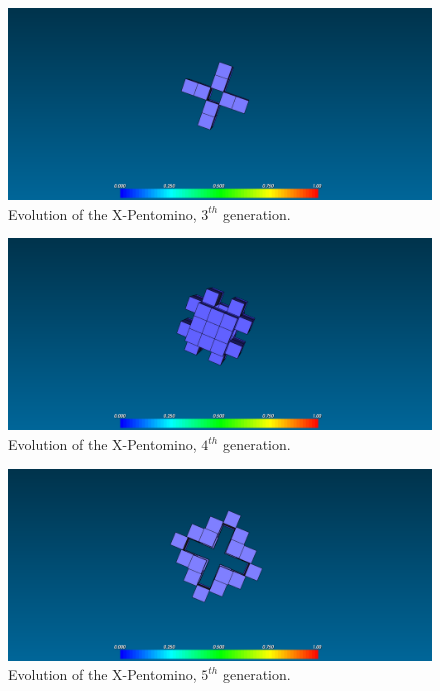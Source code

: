 \begin{figure}[H]
	\centering
	\includegraphics[scale=0.3]{pentominoes_ss/x_3.png}
	\caption{Evolution of the X-Pentomino, $3^{th}$ generation.}
	\label{fig:ss-pent:x-3}
\end{figure}

\begin{figure}[H]
	\centering
	\includegraphics[scale=0.3]{pentominoes_ss/x_4.png}
	\caption{Evolution of the X-Pentomino, $4^{th}$ generation.}
	\label{fig:ss-pent:x-4}
\end{figure}

\begin{figure}[H]
	\centering
	\includegraphics[scale=0.3]{pentominoes_ss/x_5.png}
	\caption{Evolution of the X-Pentomino, $5^{th}$ generation.}
	\label{fig:ss-pent:x-5}
\end{figure}

